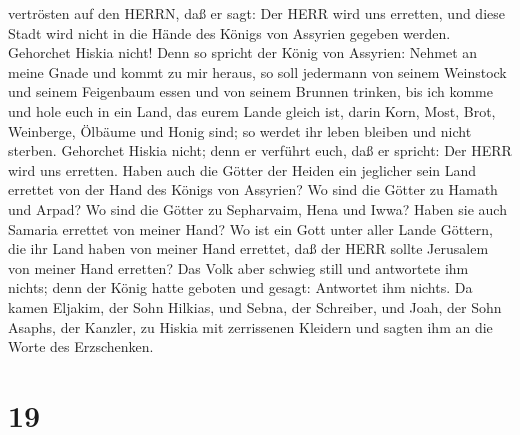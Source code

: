 vertrösten auf den HERRN, daß er sagt: Der HERR wird uns erretten, und
diese Stadt wird nicht in die Hände des Königs von Assyrien gegeben
werden.  Gehorchet Hiskia nicht! Denn so spricht der König
von Assyrien: Nehmet an meine Gnade und kommt zu mir heraus, so soll
jedermann von seinem Weinstock und seinem Feigenbaum essen und von
seinem Brunnen trinken,  bis ich komme und hole euch in ein
Land, das eurem Lande gleich ist, darin Korn, Most, Brot, Weinberge,
Ölbäume und Honig sind; so werdet ihr leben bleiben und nicht sterben.
Gehorchet Hiskia nicht; denn er verführt euch, daß er spricht: Der HERR
wird uns erretten.  Haben auch die Götter der Heiden ein
jeglicher sein Land errettet von der Hand des Königs von Assyrien?
 Wo sind die Götter zu Hamath und Arpad? Wo sind die Götter
zu Sepharvaim, Hena und Iwwa? Haben sie auch Samaria errettet von meiner
Hand?  Wo ist ein Gott unter aller Lande Göttern, die ihr
Land haben von meiner Hand errettet, daß der HERR sollte Jerusalem von
meiner Hand erretten?  Das Volk aber schwieg still und
antwortete ihm nichts; denn der König hatte geboten und gesagt:
Antwortet ihm nichts.  Da kamen Eljakim, der Sohn Hilkias,
und Sebna, der Schreiber, und Joah, der Sohn Asaphs, der Kanzler, zu
Hiskia mit zerrissenen Kleidern und sagten ihm an die Worte des
Erzschenken.

\hypertarget{section-18}{%
\section{19}\label{section-18}}

